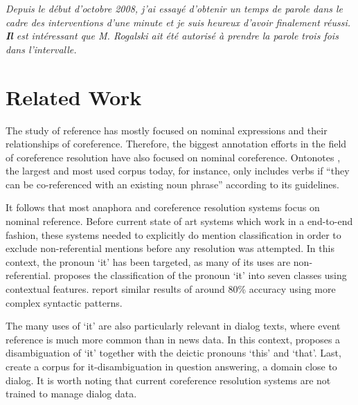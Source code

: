 \documentclass[10pt, a4paper]{article} \usepackage{lrec} \usepackage{multibib}
\begin{document}
\begin{enumerate}
\textit{Depuis le début d'octobre 2008, j'ai essayé d'obtenir un temps de parole
dans le cadre des interventions d'une minute et je suis heureux d'avoir
finalement réussi. \textbf{Il} est intéressant que M. Rogalski ait été autorisé à prendre la parole trois fois dans l'intervalle.}





\end{enumerate}



\section{Related Work}

The study of reference has mostly focused on nominal expressions and their
relationships of coreference. Therefore, the biggest annotation efforts in the
field of coreference resolution have also focused on nominal coreference.
Ontonotes \cite{pradhan-xue-2009-ontonotes}, the largest and most used corpus today, 
for instance, only includes verbs if ``they can be co-referenced with an
existing noun phrase'' according to its guidelines.

%
% 
It follows that most anaphora and coreference resolution systems focus on
nominal reference. Before current state of art systems which work in a
end-to-end fashion, these systems needed to explicitly do mention classification
in order to exclude non-referential mentions before any resolution was attempted.
In this context, the pronoun `it' has been targeted, as many of its uses are
non-referential. \cite{Evans2001} proposes the classification of the pronoun `it' into seven
classes using contextual features. \cite{Boyd2005} report similar results of
around 80\% accuracy using more complex syntactic patterns.

The many uses of `it' are also particularly relevant in dialog texts, where event reference is much more common than in news data. In this context, \cite{muller-2007-resolving} proposes a disambiguation of `it' together with the deictic pronouns `this' and `that'.  Last, \cite{Lee2016} create a corpus for it-disambiguation in question answering, a domain close to dialog. It is worth noting that current coreference resolution systems are not trained to manage dialog data.
\end{document}
